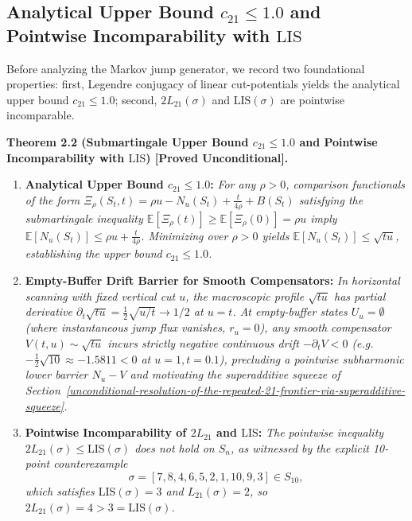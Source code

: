\documentclass[
  11pt,
]{article}
\providecommand{\tightlist}{%
  \setlength{\itemsep}{0pt}\setlength{\parskip}{0pt}}
\begin{document}
\subsection{\texorpdfstring{Analytical Upper Bound \(c_{21} \le 1.0\) and Pointwise Incomparability with \(\mathrm{LIS}\)}{Analytical Upper Bound c\_\{21\} \textbackslash le 1.0 and Pointwise Incomparability with \textbackslash mathrm\{LIS\}}}\label{evaluation-of-prior-heuristics-and-refutation-of-2-l_21-le-mathrmlis}

Before analyzing the Markov jump generator, we record two foundational properties: first, Legendre conjugacy of linear cut-potentials yields the analytical upper bound \(c_{21} \le 1.0\); second, \(2 L_{21}(\sigma)\) and \(\mathrm{LIS}(\sigma)\) are pointwise incomparable.

\textbf{Theorem 2.2 (Submartingale Upper Bound \(c_{21} \le 1.0\) and Pointwise Incomparability with \(\mathrm{LIS}\)) [Proved Unconditional].}
\begin{enumerate}
\def\labelenumi{\arabic{enumi}.}
\tightlist
\item \textbf{Analytical Upper Bound \(c_{21} \le 1.0\):} \emph{For any \(\rho > 0\), comparison functionals of the form \(\Xi_\rho(S_t, t) = \rho u - N_u(S_t) + \frac{t}{4\rho} + B(S_t)\) satisfying the submartingale inequality \(\mathbb{E}[\Xi_\rho(t)] \ge \mathbb{E}[\Xi_\rho(0)] = \rho u\) imply \(\mathbb{E}[N_u(S_t)] \le \rho u + \frac{t}{4\rho}\). Minimizing over \(\rho > 0\) yields \(\mathbb{E}[N_u(S_t)] \le \sqrt{tu}\), establishing the upper bound \(c_{21} \le 1.0\).}
\item \textbf{Empty-Buffer Drift Barrier for Smooth Compensators:} \emph{In horizontal scanning with fixed vertical cut \(u\), the macroscopic profile \(\sqrt{tu}\) has partial derivative \(\partial_t \sqrt{tu} = \frac{1}{2}\sqrt{u/t} \to 1/2\) at \(u = t\). At empty-buffer states \(U_u = \emptyset\) (where instantaneous jump flux vanishes, \(r_u = 0\)), any smooth compensator \(V(t, u) \sim \sqrt{tu}\) incurs strictly negative continuous drift \(-\partial_t V < 0\) (e.g.\ \(-\frac{1}{2}\sqrt{10} \approx -1.5811 < 0\) at \(u=1, t=0.1\)), precluding a pointwise subharmonic lower barrier \(N_u - V\) and motivating the superadditive squeeze of Section~\ref{unconditional-resolution-of-the-repeated-21-frontier-via-superadditive-squeeze}.}
\item \textbf{Pointwise Incomparability of \(2 L_{21}\) and \(\mathrm{LIS}\):} \emph{The pointwise inequality \(2 L_{21}(\sigma) \le \mathrm{LIS}(\sigma)\) does not hold on \(S_n\), as witnessed by the explicit 10-point counterexample}
\[
\sigma = [7, 8, 4, 6, 5, 2, 1, 10, 9, 3] \in S_{10},
\]
\emph{which satisfies \(\mathrm{LIS}(\sigma) = 3\) and \(L_{21}(\sigma) = 2\), so \(2 L_{21}(\sigma) = 4 > 3 = \mathrm{LIS}(\sigma)\).}
\end{enumerate}
\end{document}
